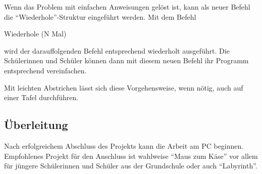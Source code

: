 Wenn das Problem mit einfachen Anweisungen gelöst ist, kann als neuer
Befehl die ``Wiederhole''-Struktur eingeführt werden. Mit dem Befehl

Wiederhole (N Mal)

wird der darauffolgenden Befehl entsprechend wiederholt ausgeführt. Die
Schülerinnen und Schüler können dann mit diesem neuen Befehl ihr
Programm entsprechend vereinfachen.

Mit leichten Abstrichen lässt sich diese Vorgehensweise, wenn nötig,
auch auf einer Tafel durchführen.

\subsection{Überleitung}\label{uxfcberleitung}

Nach erfolgreichem Abschluss des Projekts kann die Arbeit am PC
beginnen. Empfohlenes Projekt für den Anschluss ist wahlweise ``Maus zum
Käse'' vor allem für jüngere Schülerinnen und Schüler aus der
Grundschule oder auch ``Labyrinth''.

